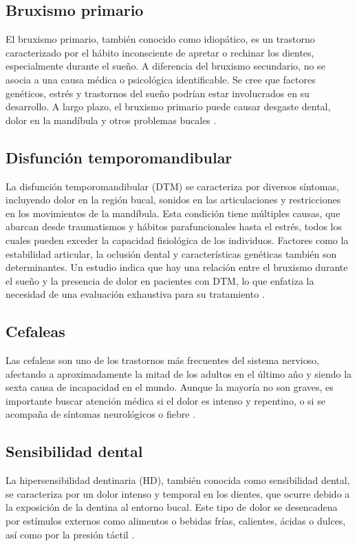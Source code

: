 \subsection{Bruxismo primario}
El bruxismo primario, también conocido como idiopático, es un trastorno caracterizado por el hábito inconsciente de apretar o rechinar los dientes, especialmente durante el sueño. A diferencia del bruxismo secundario, no se asocia a una causa médica o psicológica identificable. Se cree que factores genéticos, estrés y trastornos del sueño podrían estar involucrados en su desarrollo. A largo plazo, el bruxismo primario puede causar desgaste dental, dolor en la mandíbula y otros problemas bucales \parencite{kato2001epidemiologybruxism}.

\subsection{Disfunción temporomandibular}
La disfunción temporomandibular (DTM) se caracteriza por diversos síntomas, incluyendo dolor en la región bucal, sonidos en las articulaciones y restricciones en los movimientos de la mandíbula. Esta condición tiene múltiples causas, que abarcan desde traumatismos y hábitos parafuncionales hasta el estrés, todos los cuales pueden exceder la capacidad fisiológica de los individuos. Factores como la estabilidad articular, la oclusión dental y características genéticas también son determinantes. Un estudio indica que hay una relación entre el bruxismo durante el sueño y la presencia de dolor en pacientes con DTM, lo que enfatiza la necesidad de una evaluación exhaustiva para su tratamiento \parencite{blanco2014selfreportbruxism}.

\subsection{Cefaleas}
Las cefaleas son uno de los trastornos más frecuentes del sistema nervioso, afectando a aproximadamente la mitad de los adultos en el último año y siendo la sexta causa de incapacidad en el mundo. Aunque la mayoría no son graves, es importante buscar atención médica si el dolor es intenso y repentino, o si se acompaña de síntomas neurológicos o fiebre \parencite{clinica2018cefalea}.

\subsection{Sensibilidad dental}
La hipersensibilidad dentinaria (HD), también conocida como sensibilidad dental, se caracteriza por un dolor intenso y temporal en los dientes, que ocurre debido a la exposición de la dentina al entorno bucal. Este tipo de dolor se desencadena por estímulos externos como alimentos o bebidas frías, calientes, ácidas o dulces, así como por la presión táctil \parencite{dentaid2024sensibilidad}.

